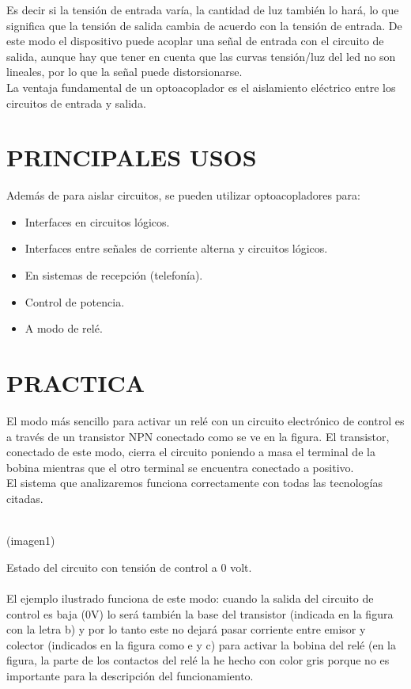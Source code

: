 \documentclass[12pt,letterpaper]{article}
\begin{document}
	Es decir si la tensión de entrada varía, la cantidad de luz también lo hará, lo que significa que la tensión de salida cambia de acuerdo con la tensión de entrada. De este modo el dispositivo puede acoplar una señal de entrada con el circuito de salida, aunque hay que tener en cuenta que las curvas tensión/luz del led no son lineales, por lo que la señal puede distorsionarse. \\
	La ventaja fundamental de un optoacoplador es el aislamiento eléctrico entre los circuitos de entrada y salida. \\
\section{PRINCIPALES USOS}
Además de para aislar circuitos, se pueden utilizar optoacopladores para: 
	\begin{itemize}
		\item Interfaces en circuitos lógicos.
		\item Interfaces entre señales de corriente alterna y circuitos lógicos.
		\item En sistemas de recepción (telefonía).
		\item Control de potencia.
		\item A modo de relé.
	\end{itemize}
\newpage
\section{PRACTICA}
	El modo más sencillo para activar un relé con un circuito electrónico de control es a través
	de un transistor NPN conectado como se ve en la figura. El transistor, conectado de este
	modo, cierra el circuito poniendo a masa el terminal de la bobina mientras que el otro terminal
	se encuentra conectado a positivo.\\
	El sistema que analizaremos funciona correctamente con todas las tecnologías citadas.\\\\
	\begin{center}
	(imagen1)
	\end{center}
	Estado del circuito con tensión de control a 0 volt.\\\\
	El ejemplo ilustrado funciona de este modo: cuando la salida del circuito de control es baja
	(0V) lo será también la base del transistor (indicada en la figura con la letra b) y por lo tanto
	este no dejará pasar corriente entre emisor y colector (indicados en la figura como e y c) para activar la bobina del relé (en la figura, la parte de los contactos del relé la he hecho con color
	gris porque no es importante para la descripción del funcionamiento. 
\end{document}
